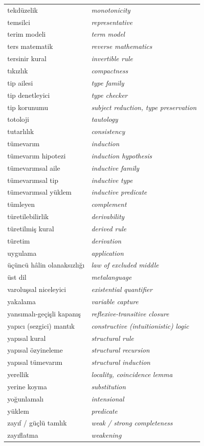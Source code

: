 \begin{center}
\begin{tabularx}{\linewidth}{>{\raggedright\arraybackslash}X >{\raggedright\arraybackslash\itshape}X}
tekdüzelik & monotonicity \\
temsilci & representative \\
terim modeli & term model \\
ters matematik & reverse mathematics \\
tersinir kural & invertible rule \\
tıkızlık & compactness \\
tip ailesi & type family \\
tip denetleyici & type checker \\
tip korunumu & subject reduction, type preservation \\
totoloji & tautology \\
tutarlılık & consistency \\
tümevarım & induction \\
tümevarım hipotezi & induction hypothesis \\
tümevarımsal aile & inductive family \\
tümevarımsal tip & inductive type \\
tümevarımsal yüklem & inductive predicate \\
tümleyen & complement \\
türetilebilirlik & derivability \\
türetilmiş kural & derived rule \\
türetim & derivation \\
uygulama & application \\
üçüncü hâlin olanaksızlığı & law of excluded middle \\
üst dil & metalanguage \\
varoluşsal niceleyici & existential quantifier \\
yakalama & variable capture \\
yansımalı-geçişli kapanış & reflexive-transitive closure \\
yapıcı (sezgici) mantık & constructive (intuitionistic) logic \\
yapısal kural & structural rule \\
yapısal özyineleme & structural recursion \\
yapısal tümevarım & structural induction \\
yerellik & locality, coincidence lemma \\
yerine koyma & substitution \\
yoğunlamalı & intensional \\
yüklem & predicate \\
zayıf / güçlü tamlık & weak / strong completeness \\
zayıflatma & weakening \\
\end{tabularx}
\end{center}
